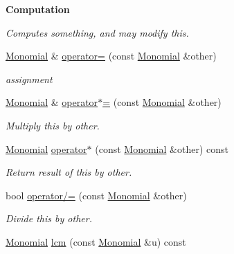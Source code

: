 \begin{Indent}\textbf{ Computation}\par
{\em Computes something, and may modify {\ttfamily this}. }\begin{DoxyCompactItemize}
\item 
\mbox{\label{class_monomial_a031963d851198221d949d84fb32af907}} 
\hyperlink{class_monomial}{Monomial} \& \hyperlink{class_monomial_a031963d851198221d949d84fb32af907}{operator=} (const \hyperlink{class_monomial}{Monomial} \&other)
\begin{DoxyCompactList}\small\item\em assignment \end{DoxyCompactList}\item 
\mbox{\label{class_monomial_ad69e9257c8afdab1adeeebff3d9bd87f}} 
\hyperlink{class_monomial}{Monomial} \& \hyperlink{class_monomial_ad69e9257c8afdab1adeeebff3d9bd87f}{operator$\ast$=} (const \hyperlink{class_monomial}{Monomial} \&other)
\begin{DoxyCompactList}\small\item\em Multiply {\ttfamily this} by {\ttfamily other}. \end{DoxyCompactList}\item 
\mbox{\label{class_monomial_a12f23777300868c735ce6f83868a5cce}} 
\hyperlink{class_monomial}{Monomial} \hyperlink{class_monomial_a12f23777300868c735ce6f83868a5cce}{operator$\ast$} (const \hyperlink{class_monomial}{Monomial} \&other) const
\begin{DoxyCompactList}\small\item\em Return result of {\ttfamily this} by {\ttfamily other}. \end{DoxyCompactList}\item 
bool \hyperlink{class_monomial_a764a69f76747cf8f5f58ef6473028204}{operator/=} (const \hyperlink{class_monomial}{Monomial} \&other)
\begin{DoxyCompactList}\small\item\em Divide {\ttfamily this} by {\ttfamily other}. \end{DoxyCompactList}\item 
\mbox{\label{class_monomial_a168381ee5e477d90f59dec9f26b24cc6}} 
\hyperlink{class_monomial}{Monomial} \hyperlink{class_monomial_a168381ee5e477d90f59dec9f26b24cc6}{lcm} (const \hyperlink{class_monomial}{Monomial} \&u) const

\end{DoxyCompactItemize}
\end{Indent}
